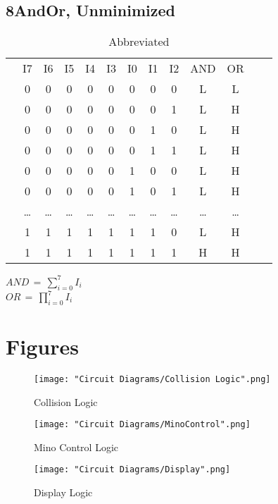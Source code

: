 \documentclass[letterpaper,titlepage,oneside]{article}
\begin{document}
\subsection*{8AndOr, Unminimized}
\begin{table}['h']
\begin{center}
\begin{tabular}{c|c|c|c|c|c|c|c|c|c|c|c|c}
\cline{2-11}
& I7 & I6 & I5 & I4 & I3 & I0 & I1 & I2 & AND & OR \\ 
\cline{2-11}
& 0 & 0 & 0 & 0 & 0 & 0 & 0 & 0 & L & L  \\  
& 0 & 0 & 0 & 0 & 0 & 0 & 0 & 1 & L & H \\
& 0 & 0 & 0 & 0 & 0 & 0 & 1 & 0 & L & H \\
& 0 & 0 & 0 & 0 & 0 & 0 & 1 & 1 & L & H \\
& 0 & 0 & 0 & 0 & 0 & 1 & 0 & 0 & L & H \\
& 0 & 0 & 0 & 0 & 0 & 1 & 0 & 1 & L & H \\
& \ldots{} & \ldots{} & \ldots{} & \ldots{} & \ldots{} & \ldots{} & %
\ldots{} & \ldots{} & \ldots{} & \ldots{}\\
& 1 & 1 & 1 & 1 & 1 & 1 & 1 & 0 & L & H \\
& 1 & 1 & 1 & 1 & 1 & 1 & 1 & 1 & H & H \\
\cline{2-11}
\end{tabular}
\caption{Abbreviated}\label{8AndOr_Unminimized}
\begin{normalsize}
$AND \,=\, \sum_{i=0}^{7} I_{i} $
\\[5pt]
$OR \, = \, \prod_{i=0}^{7} I_{i}$
\end{normalsize}
\end{center}
\end{table}


\pagebreak

\section{Figures}


\begin{figure}[hp]
\begin{center}
\texttt{[image: "Circuit Diagrams/Collision Logic".png]}
\caption{Collision Logic}
\label{fig:Collision}
\end{center}
\end{figure}


\begin{figure}[h]
\begin{center}
\texttt{[image: "Circuit Diagrams/MinoControl".png]}
\caption{Mino Control Logic}
\label{fig:Mino Control}
\end{center}
\end{figure}

\begin{figure}[hp]
\begin{center}
\texttt{[image: "Circuit Diagrams/Display".png]}
\caption{Display Logic}
\label{fig:Display}
\end{center}
\end{figure}
\end{document}
